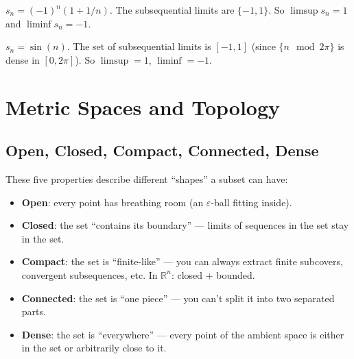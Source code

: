 \documentclass[11pt]{article}
\newcommand{\R}{\mathbb{R}}
\newcommand{\eps}{\varepsilon}
\theoremstyle{definition}
\begin{document}
\begin{example}
$s_n = (-1)^n(1 + 1/n)$. The subsequential limits are $\{-1, 1\}$. So $\limsup s_n = 1$ and $\liminf s_n = -1$.
\end{example}

\begin{example}
$s_n = \sin(n)$. The set of subsequential limits is $[-1, 1]$ (since $\{n \mod 2\pi\}$ is dense in $[0, 2\pi]$). So $\limsup = 1$, $\liminf = -1$.
\end{example}

\section{Metric Spaces and Topology}

\subsection{Open, Closed, Compact, Connected, Dense}

\begin{intuition}
These five properties describe different ``shapes'' a subset can have:
\begin{itemize}
\item \textbf{Open}: every point has breathing room (an $\eps$-ball fitting inside).
\item \textbf{Closed}: the set ``contains its boundary'' --- limits of sequences in the set stay in the set.
\item \textbf{Compact}: the set is ``finite-like'' --- you can always extract finite subcovers, convergent subsequences, etc. In $\R^n$: closed + bounded.
\item \textbf{Connected}: the set is ``one piece'' --- you can't split it into two separated parts.
\item \textbf{Dense}: the set is ``everywhere'' --- every point of the ambient space is either in the set or arbitrarily close to it.
\end{itemize}
\end{intuition}
\end{document}
